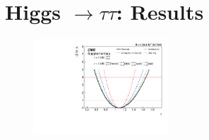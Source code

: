 
\chapter{Higgs $\to \tau\tau$: Results}


\begin{figure}[htbp]
\centering
     \includegraphics[width=0.45\textwidth]{higgs_to_taus/plots/cms_output_freeze_All_Theory_bbb}\\
     \caption{
     }
     \label{fig:htt_systematic_parabola}
\end{figure}





